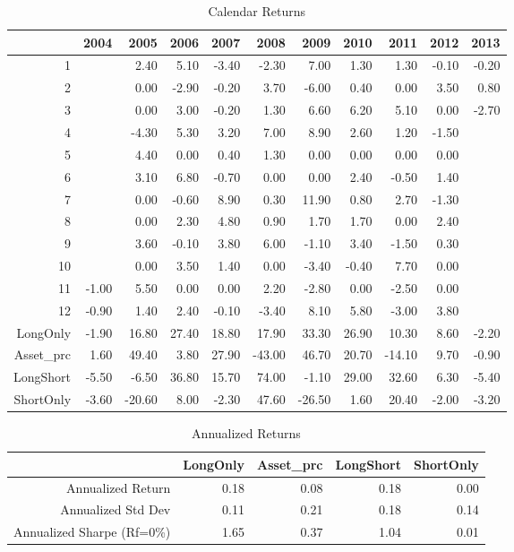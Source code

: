 \documentclass{article}
\begin{document}
\begin{table}[ht]
\centering
\caption{Calendar Returns} 
\begin{tabular}{rrrrrrrrrrr}
  \hline
 & 2004 & 2005 & 2006 & 2007 & 2008 & 2009 & 2010 & 2011 & 2012 & 2013 \\ 
  \hline
1 &  & 2.40 & 5.10 & -3.40 & -2.30 & 7.00 & 1.30 & 1.30 & -0.10 & -0.20 \\ 
  2 &  & 0.00 & -2.90 & -0.20 & 3.70 & -6.00 & 0.40 & 0.00 & 3.50 & 0.80 \\ 
  3 &  & 0.00 & 3.00 & -0.20 & 1.30 & 6.60 & 6.20 & 5.10 & 0.00 & -2.70 \\ 
  4 &  & -4.30 & 5.30 & 3.20 & 7.00 & 8.90 & 2.60 & 1.20 & -1.50 &  \\ 
  5 &  & 4.40 & 0.00 & 0.40 & 1.30 & 0.00 & 0.00 & 0.00 & 0.00 &  \\ 
  6 &  & 3.10 & 6.80 & -0.70 & 0.00 & 0.00 & 2.40 & -0.50 & 1.40 &  \\ 
  7 &  & 0.00 & -0.60 & 8.90 & 0.30 & 11.90 & 0.80 & 2.70 & -1.30 &  \\ 
  8 &  & 0.00 & 2.30 & 4.80 & 0.90 & 1.70 & 1.70 & 0.00 & 2.40 &  \\ 
  9 &  & 3.60 & -0.10 & 3.80 & 6.00 & -1.10 & 3.40 & -1.50 & 0.30 &  \\ 
  10 &  & 0.00 & 3.50 & 1.40 & 0.00 & -3.40 & -0.40 & 7.70 & 0.00 &  \\ 
  11 & -1.00 & 5.50 & 0.00 & 0.00 & 2.20 & -2.80 & 0.00 & -2.50 & 0.00 &  \\ 
  12 & -0.90 & 1.40 & 2.40 & -0.10 & -3.40 & 8.10 & 5.80 & -3.00 & 3.80 &  \\ 
  LongOnly & -1.90 & 16.80 & 27.40 & 18.80 & 17.90 & 33.30 & 26.90 & 10.30 & 8.60 & -2.20 \\ 
  Asset\_prc & 1.60 & 49.40 & 3.80 & 27.90 & -43.00 & 46.70 & 20.70 & -14.10 & 9.70 & -0.90 \\ 
  LongShort & -5.50 & -6.50 & 36.80 & 15.70 & 74.00 & -1.10 & 29.00 & 32.60 & 6.30 & -5.40 \\ 
  ShortOnly & -3.60 & -20.60 & 8.00 & -2.30 & 47.60 & -26.50 & 1.60 & 20.40 & -2.00 & -3.20 \\ 
   \hline
\end{tabular}
\end{table}%
\begin{table}[ht]
\centering
\caption{Annualized Returns} 
\begin{tabular}{rrrrr}
  \hline
 & LongOnly & Asset\_prc & LongShort & ShortOnly \\ 
  \hline
Annualized Return & 0.18 & 0.08 & 0.18 & 0.00 \\ 
  Annualized Std Dev & 0.11 & 0.21 & 0.18 & 0.14 \\ 
  Annualized Sharpe (Rf=0\%) & 1.65 & 0.37 & 1.04 & 0.01 \\ 
   \hline
\end{tabular}
\end{table}%
\end{document}
